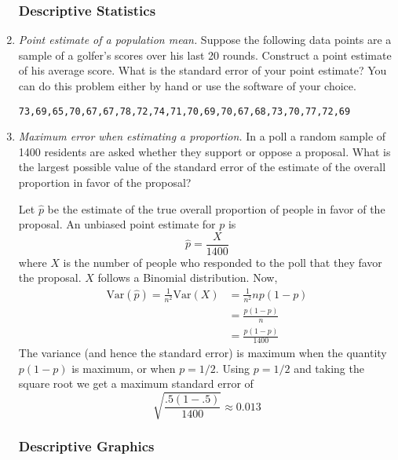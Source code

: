 \begin{enumerate}
\subsubsection*{Descriptive Statistics}

\item \emph{Point estimate of a population mean.} Suppose the
  following data points are a sample of a golfer's scores over his last 20 rounds.
  Construct a point estimate of his average score. What is the standard error of your point estimate? You can do
  this problem either by hand or use the software of your choice. 
\begin{verbatim}
73,69,65,70,67,67,78,72,74,71,70,69,70,67,68,73,70,77,72,69
\end{verbatim}
  
\item \emph{Maximum error when estimating a proportion.} In a poll a
  random sample of \num{1400} residents are asked whether they support
  or oppose a proposal. What is the largest possible value of the
  standard error of the estimate of the overall proportion in favor of
  the proposal?

\begin{solution}
  \bs Let $\hat{p}$ be the estimate of the true overall proportion of
  people in favor of the proposal. An unbiased point estimate for $p$
  is
\[ \hat{p} = \frac{X}{1400} \]
where $X$ is the number of people who responded to the poll that they
favor the proposal. $X$ follows a Binomial distribution. Now,
\begin{align*}
  \text{Var}(\hat{p}) = \frac{1}{n^2}\text{Var}(X) &= \frac{1}{n^2}np(1-p) \\
                                                   &= \frac{p(1-p)}{n} \\
                                                   &= \frac{p(1-p)}{1400}
\end{align*}
The variance (and hence the standard error) is maximum when the
quantity $p(1-p)$ is maximum, or when $p=1/2$. Using $p=1/2$ and
taking the square root we get a maximum standard error of
\[ \sqrt{\frac{.5(1-.5)}{1400}} \approx 0.013 \]

\end{solution}

\subsubsection*{Descriptive Graphics}


\end{enumerate}
